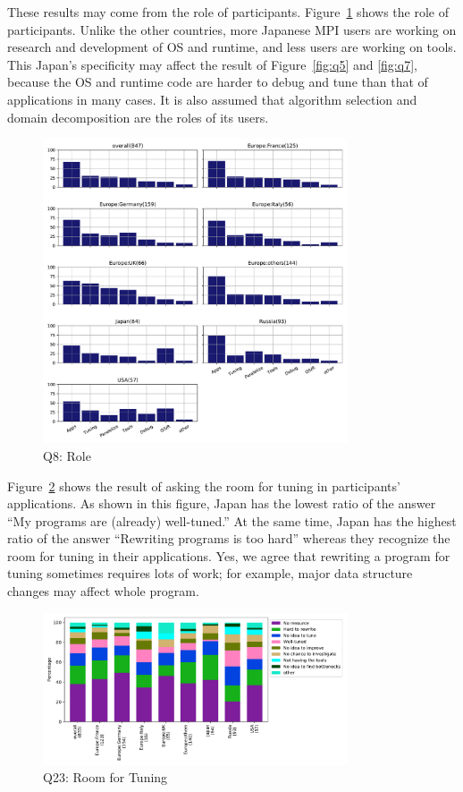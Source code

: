 \documentclass[submit,techrep,noauthor,english]{ipsj}
\begin{document}
These results may come from the role of
participants. Figure~\ref{fig:q8} shows the role of 
participants. Unlike the other countries, more Japanese MPI users are
working on research and development of OS and runtime, and less users
are working on tools. This Japan's specificity may affect the result
of Figure~\ref{fig:q5} and \ref{fig:q7}, because the OS and runtime
code are harder to debug and tune than that of applications in many
cases. It is also assumed that algorithm selection and domain
decomposition are the roles of its users. 

\begin{figure}[htb]
\begin{center}
\includegraphics[width=9cm]{../pdfs/Q8.pdf}
  \vspace{-8mm}
\caption{Q8: Role}
\label{fig:q8}
\end{center}
\end{figure}

Figure~\ref{fig:q23} shows the result of asking the room for tuning in
participants' applications. As shown in this figure, Japan has the
lowest ratio of the answer ``My programs are (already) well-tuned.''
At the same time, Japan has the highest ratio of the answer
``Rewriting programs is too hard'' whereas they recognize the room for
tuning in their applications. Yes, we agree that rewriting a program
for tuning sometimes requires lots of work; for example, major data
structure changes may affect whole program.

\begin{figure}[htb]
\begin{center}
\includegraphics[width=9cm]{../pdfs/Q23.pdf}
  \vspace{-8mm}
\caption{Q23: Room for Tuning}
\label{fig:q23}
\end{center}
\end{figure}
\end{document}
